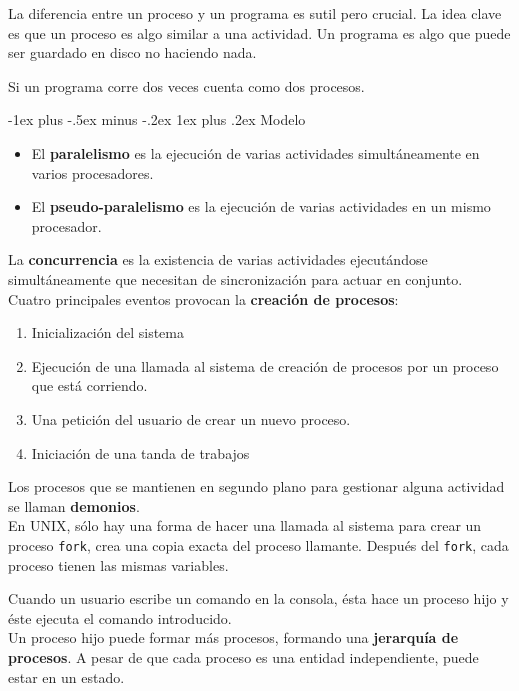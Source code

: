 \documentclass[10pt,portrait, twocolumn]{article}
\makeatletter
\renewcommand{\subsubsection}{\@startsection{subsubsection}{3}{0mm}%
                                {-1ex plus -.5ex minus -.2ex}%
                                {1ex plus .2ex}%
                                {\normalfont\small\bfseries}}
\makeatother
\begin{document}
\quad La diferencia entre un proceso y un programa es sutil pero crucial. La idea clave es que un proceso es algo similar a una actividad. Un programa es algo que puede ser guardado en disco no haciendo nada. 

\quad Si un programa corre dos veces cuenta como dos procesos.

\subsubsection{Modelo}

\begin{itemize}
\item El \textbf{paralelismo} es la ejecución de varias actividades simultáneamente en varios procesadores.
\item El \textbf{pseudo-paralelismo} es la ejecución de varias actividades en un mismo procesador.
\end{itemize}

La \textbf{concurrencia} es la existencia de varias actividades ejecutándose simultáneamente que necesitan de sincronización para actuar en conjunto.\\

Cuatro principales eventos provocan la \textbf{creación de procesos}:

	\begin{enumerate}
	\item Inicialización del sistema
	\item Ejecución de una llamada al sistema de creación de procesos por un proceso que está corriendo.
	\item Una petición del usuario de crear un nuevo proceso.
	\item Iniciación de una tanda de trabajos
	\end{enumerate}
	
Los procesos que se mantienen en segundo plano para gestionar alguna actividad se llaman \textbf{demonios}.\\

En UNIX, sólo hay una forma de hacer una llamada al sistema para crear un proceso \texttt{fork}, crea una copia exacta del proceso llamante. Después del \texttt{fork}, cada proceso tienen las mismas variables.

	\quad Cuando un usuario escribe un comando en la consola, ésta hace un proceso hijo y éste ejecuta el comando introducido.\\

Un proceso hijo puede formar más procesos, formando una \textbf{jerarquía de procesos}.  A pesar de que cada proceso es una entidad independiente, puede estar en un estado. 
\end{document}
